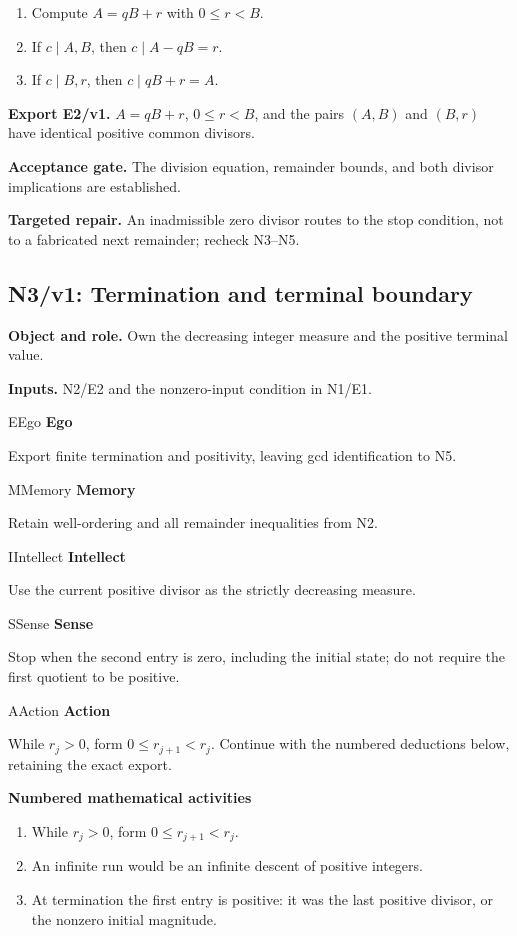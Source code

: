 \documentclass[preprint,12pt,aps,pra,showkeys,amsmath,amssymb,superscriptaddress,floatfix]{revtex4-2}
\theoremstyle{definition}
\theoremstyle{remark}
\newcommand{\mmfaculty}[3]{%
 \begin{mmfacultybox}{#1}{#2}
 {\sffamily\bfseries\color{MMBlue}#2}\par\smallskip #3
 \end{mmfacultybox}}
\newcommand{\field}[2]{\par\smallskip\noindent\textbf{#1.} #2\par}
\begin{document}
\begin{enumerate}[label=N2.\arabic*,leftmargin=3.4em]

\item Compute \(A=qB+r\) with \(0\le r<B\).

\item If \(c\mid A,B\), then \(c\mid A-qB=r\).

\item If \(c\mid B,r\), then \(c\mid qB+r=A\).

\end{enumerate}

\field{Export E2/v1}{\(A=qB+r\), \(0\le r<B\), and the pairs \((A,B)\) and \((B,r)\) have
identical positive common divisors.}

\field{Acceptance gate}{The division equation, remainder bounds, and both divisor implications
are established.}

\field{Targeted repair}{An inadmissible zero divisor routes to the stop condition, not to a
fabricated next remainder; recheck N3--N5.}

\clearpage

\subsection{N3/v1: Termination and terminal boundary}

\field{Object and role}{Own the decreasing integer measure and the positive terminal value.}

\field{Inputs}{N2/E2 and the nonzero-input condition in N1/E1.}

\mmfaculty{E}{Ego}{Export finite termination and positivity, leaving gcd identification to
N5.}

\mmfaculty{M}{Memory}{Retain well-ordering and all remainder inequalities from N2.}

\mmfaculty{I}{Intellect}{Use the current positive divisor as the strictly decreasing measure.}

\mmfaculty{S}{Sense}{Stop when the second entry is zero, including the initial state; do not
require the first quotient to be positive.}

\mmfaculty{A}{Action}{While \(r_j>0\), form \(0\le r_{j+1}<r_j\). Continue with the numbered
deductions below, retaining the exact export.}

\smallskip\noindent\textbf{Numbered mathematical activities}

\begin{enumerate}[label=N3.\arabic*,leftmargin=3.4em]

\item While \(r_j>0\), form \(0\le r_{j+1}<r_j\).

\item An infinite run would be an infinite descent of positive integers.

\item At termination the first entry is positive: it was the last positive
divisor, or the nonzero initial magnitude.

\end{enumerate}
\end{document}
